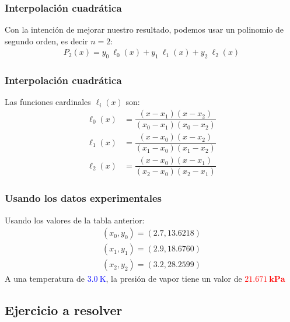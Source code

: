 \documentclass[12pt]{beamer}
\begin{document}
\begin{frame}
\frametitle{Interpolación cuadrática}
Con la intención de mejorar nuestro resultado, podemos usar un polinomio de segundo orden, es decir $n = 2$:
\pause
\begin{align*}
P_{2} (x) = y_{0} \: \ell_{0} (x) + y_{1} \: \ell_{1} (x) + y_{2} \: \ell_{2} (x)
\end{align*}
\end{frame}
\begin{frame}
\frametitle{Interpolación cuadrática}
Las funciones cardinales $\ell_{i}(x)$ son:
\pause
\begin{align*}
\ell_{0} (x) &= \dfrac{(x - x_{1})(x - x_{2})}{(x_{0} - x_{1})(x_{0} - x_{2})} \\[1em]
\ell_{1} (x) &= \dfrac{(x - x_{0})(x - x_{2})}{(x_{1} - x_{0})(x_{1} - x_{2})} \\[1em]
\ell_{2} (x) &= \dfrac{(x - x_{0})(x - x_{1})}{(x_{2} - x_{0})(x_{2} - x_{1})} 
\end{align*}
\end{frame}
\begin{frame}
\frametitle{Usando los datos experimentales}
Usando los valores de la tabla anterior:
\pause
\begin{eqnarray*}
(x_{0}, y_{0}) = (2.7, 13.6218) \\
(x_{1}, y_{1}) = (2.9, 18.6760) \\
(x_{2}, y_{2}) = (3.2, 28.2599)
\end{eqnarray*}
\pause
A una temperatura de \textcolor{blue}{$\SI{3.0}{\kelvin}$}, la presión de vapor tiene un valor de \textcolor{red}{$\mathbf{\SI{21.671}{\kilo\pascal}}$}
\\
\bigskip
{}
\end{frame}

\subsection{Ejercicio a resolver}
\end{document}
